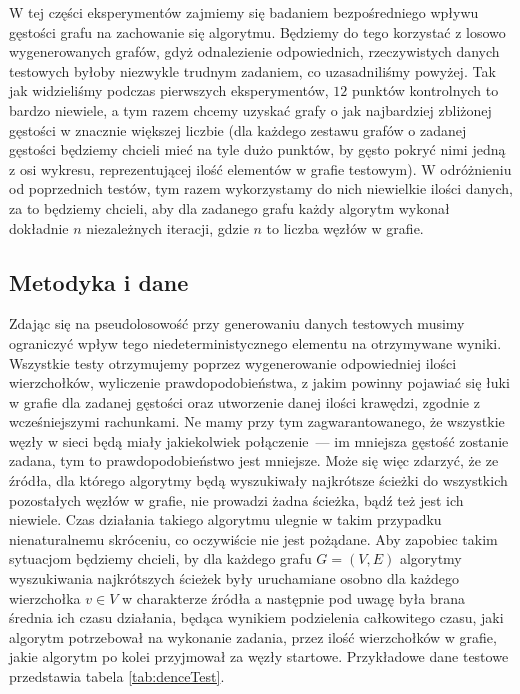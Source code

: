 W tej części eksperymentów zajmiemy się badaniem bezpośredniego wpływu gęstości grafu na zachowanie się algorytmu. Będziemy do tego korzystać z losowo wygenerowanych grafów, gdyż odnalezienie odpowiednich, rzeczywistych danych testowych byłoby niezwykle trudnym zadaniem, co uzasadniliśmy powyżej. Tak jak widzieliśmy podczas pierwszych eksperymentów, $12$ punktów kontrolnych to bardzo niewiele, a tym razem chcemy uzyskać grafy o jak najbardziej zbliżonej gęstości w znacznie większej liczbie (dla każdego zestawu grafów o zadanej gęstości będziemy chcieli mieć na tyle dużo punktów, by gęsto pokryć nimi jedną z osi wykresu, reprezentującej ilość elementów w grafie testowym). W odróżnieniu od poprzednich testów, tym razem wykorzystamy do nich niewielkie ilości danych, za to będziemy chcieli, aby dla zadanego grafu każdy algorytm wykonał dokładnie $n$ niezależnych iteracji, gdzie $n$ to liczba węzłów w grafie.

\subsection{Metodyka i dane}

Zdając się na pseudolosowość przy generowaniu danych testowych musimy ograniczyć wpływ tego niedeterministycznego elementu na otrzymywane wyniki. Wszystkie testy otrzymujemy poprzez wygenerowanie odpowiedniej ilości wierzchołków, wyliczenie prawdopodobieństwa, z jakim powinny pojawiać się łuki w grafie dla zadanej gęstości oraz utworzenie danej ilości krawędzi, zgodnie z wcześniejszymi rachunkami. Ne mamy przy tym zagwarantowanego, że wszystkie węzły w sieci będą miały jakiekolwiek połączenie~--- im mniejsza gęstość zostanie zadana, tym to prawdopodobieństwo jest mniejsze. Może się więc zdarzyć, że ze źródła, dla którego algorytmy będą wyszukiwały najkrótsze ścieżki do wszystkich pozostałych węzłów w grafie, nie prowadzi żadna ścieżka, bądź też jest ich niewiele. Czas działania takiego algorytmu ulegnie w takim przypadku nienaturalnemu skróceniu, co oczywiście nie jest pożądane. Aby zapobiec takim sytuacjom będziemy chcieli, by dla każdego grafu $ G = \left( V, E \right) $ algorytmy wyszukiwania najkrótszych ścieżek były uruchamiane osobno dla każdego wierzchołka $v \in V$ w charakterze źródła a następnie pod uwagę była brana średnia ich czasu działania, będąca wynikiem podzielenia całkowitego czasu, jaki algorytm potrzebował na wykonanie zadania, przez ilość wierzchołków w grafie, jakie algorytm po kolei przyjmował za węzły startowe. Przykładowe dane testowe przedstawia tabela \ref{tab:denceTest}.

